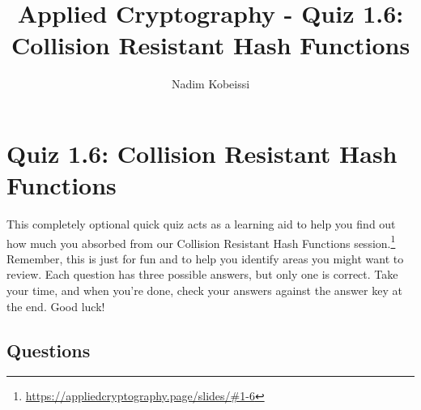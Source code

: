 \documentclass[10pt,a4paper,american]{exam}
\title{Applied Cryptography - Quiz 1.6: Collision Resistant Hash Functions}
\author{Nadim Kobeissi}
\begin{document}
\classhandoutheader
\section*{Quiz 1.6: Collision Resistant Hash Functions}

\begin{tcolorbox}[colframe=OliveGreen!30!white,colback=OliveGreen!5!white]
	This completely optional quick quiz acts as a learning aid to help you find out how much you absorbed from our Collision Resistant Hash Functions session.\footnote{\url{https://appliedcryptography.page/slides/\#1-6}} Remember, this is just for fun and to help you identify areas you might want to review. Each question has three possible answers, but only one is correct. Take your time, and when you're done, check your answers against the answer key at the end. Good luck!
\end{tcolorbox}

\subsection*{Questions}
\end{document}
